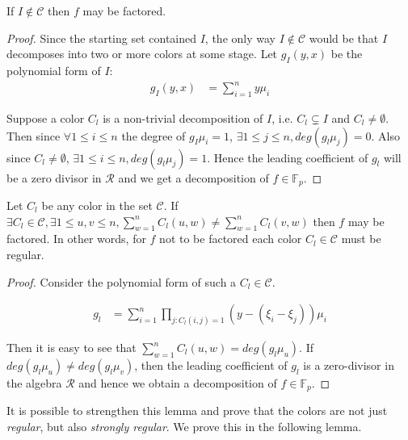 	\begin{lemma} \label{identity}
		If $I \notin \mathcal{C}$ then $f$ may be factored.
	\end{lemma}

	\begin{proof}
			Since the starting set contained $I$, the only way $I \notin \mathcal{C}$ would be that $I$ decomposes into two or more colors at some stage. Let $g_I(y,x)$ be the polynomial form of $I$:
			\begin{align*}
				g_I(y,x) &= \sum_{i=1}^n y \mu_i
			\end{align*}
			
			Suppose a color $C_l$ is a non-trivial decomposition of $I$, i.e. $C_l \subsetneq I$ and $C_l \neq \emptyset$. Then since $\forall 1 \le i \le n$ the degree of $g_I\mu_i=1$, $\exists 1 \le j \le n,
			deg(g_l\mu_j)=0$. Also since $C_l\neq \emptyset$,
			$\exists 1 \le i \le n, deg(g_l\mu_j)=1$. Hence the leading coefficient of $g_l$ will be a zero divisor in $\mathcal{R}$ and we get a decomposition of $f \in \mathbb{F}_p$.

		\end{proof}
			

		\begin{lemma}\label{regular}
		 Let $C_l$ be any color in the set $\mathcal{C}$. If $\exists C_l \in \mathcal{C},\exists 1 \le u,v \le n,\displaystyle \sum_{w=1}^n C_l(u,w) \neq \sum_{w=1}^n C_l(v,w)$ then $f$ may be factored. In other words, for
		 $f$ not to be factored each color $C_l \in \mathcal{C}$ must be regular.
	 \end{lemma}


	 \begin{proof}
		 Consider the polynomial form of such a $C_l \in \mathcal{C}$. 

		 \begin{align*}
			 g_l &= \sum_{i=1}^n \prod_{j:C_l(i,j)=1} (y-(\xi_i-\xi_j)) \mu_i
		 \end{align*}

		 Then it is easy to see that $\sum_{w=1}^n C_l(u,w) = deg(g_l\mu_u)$. If $deg(g_l\mu_u) \neq deg(g_l\mu_v)$, then the leading coefficient of $g_l$ is a zero-divisor in the algebra $\mathcal{R}$ and hence
		 we obtain a decomposition of $f \in \mathbb{F}_p$.
	 \end{proof}

	 It is possible to strengthen this lemma and prove that the colors are not just \emph{regular}, but also \emph{strongly regular}. We prove this in the following lemma.

